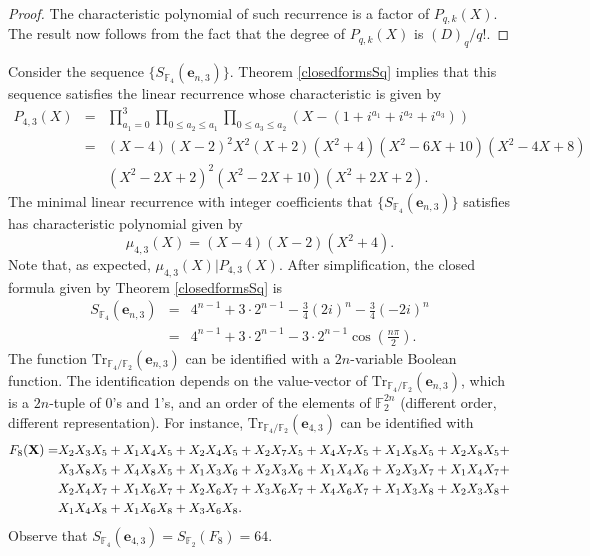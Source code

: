 \begin{proof}
 The characteristic polynomial of such recurrence is a factor of $P_{q,k}(X)$.  The result now follows from the fact that the degree of $P_{q,k}(X)$ is $(D)_q/q!$.
\end{proof}

\begin{example}
\label{exF4}
 Consider the sequence $\{S_{\mathbb{F}_4}(\boldsymbol{e}_{n,3})\}$.  Theorem \ref{closedformsSq} implies that this sequence satisfies the linear recurrence whose characteristic is given by
\begin{eqnarray*}
 P_{4,3}(X)&=& \prod_{a_1=0}^3\prod_{0\leq a_2\leq a_1}\prod_{0\leq a_3\leq a_2}\left(X-\left(1+i^{a_1}+i^{a_2}+i^{a_3}\right)\right)\\
 &=&(X-4) (X-2)^2 X^2 (X+2) \left(X^2+4\right) \left(X^2-6 X+10\right) \left(X^2-4 X+8\right)\\
 &&\left(X^2-2 X+2\right)^2 \left(X^2-2 X+10\right) \left(X^2+2 X+2\right).
\end{eqnarray*}
The minimal linear recurrence with integer coefficients that $\{S_{\mathbb{F}_4}(\boldsymbol{e}_{n,3})\}$ satisfies has characteristic polynomial given by
$$\mu_{4,3}(X)=(X-4) (X-2) \left(X^2+4\right).$$
Note that, as expected, $\mu_{4,3}(X)|P_{4,3}(X)$.  After simplification, the closed formula given by Theorem \ref{closedformsSq} is
\begin{eqnarray*}
S_{\mathbb{F}_4}(\boldsymbol{e}_{n,3})&=&4^{n-1}+3\cdot 2^{n-1}-\frac{3}{4}(2i)^n-\frac{3}{4}(-2i)^n\\
&=&4^{n-1}+3\cdot 2^{n-1}-3\cdot 2^{n-1} \cos \left(\frac{n\pi}{2}\right).
\end{eqnarray*}
The function $\text{Tr}_{\mathbb{F}_4/\mathbb{F}_2}(\boldsymbol{e}_{n,3})$ can be identified with a $2n$-variable Boolean function.  The identification depends on the value-vector of $\text{Tr}_{\mathbb{F}_4/\mathbb{F}_2}(\boldsymbol{e}_{n,3})$,
which is a $2n$-tuple of 0's and 1's, and an order of the elements of $\mathbb{F}_{2}^{2n}$ (different order, different representation).  For instance, $\text{Tr}_{\mathbb{F}_4/\mathbb{F}_2}(\boldsymbol{e}_{4,3})$ can be identified with
\begin{align*}
 F_8({\bf X})=&X_2 X_3 X_5+X_1 X_4 X_5+X_2 X_4 X_5+X_2 X_7 X_5+X_4 X_7 X_5+X_1 X_8 X_5+X_2 X_8 X_5+\\
 &X_3 X_8 X_5+X_4 X_8 X_5+X_1 X_3 X_6+X_2 X_3 X_6+X_1 X_4 X_6+X_2 X_3 X_7+X_1 X_4 X_7+\\
 &X_2 X_4 X_7+X_1 X_6 X_7+X_2 X_6 X_7+X_3 X_6 X_7+X_4 X_6 X_7+X_1 X_3 X_8+X_2 X_3 X_8+\\
 &X_1 X_4 X_8+X_1 X_6 X_8+X_3 X_6 X_8.
\end{align*}
Observe that $S_{\mathbb{F}_4}(\boldsymbol{e}_{4,3})=S_{\mathbb{F}_2}(F_8)=64.$
\end{example}

